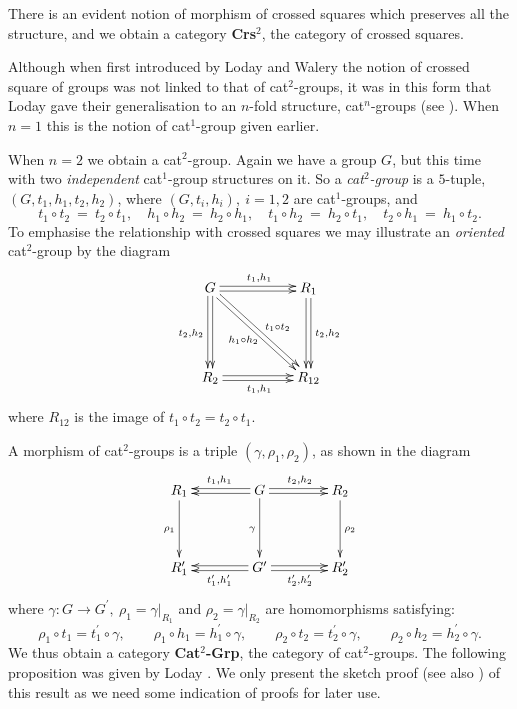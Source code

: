 \documentclass[a4paper,11pt]{article}
\theoremstyle{plain}
\theoremstyle{definition}
\begin{document}
There is an evident notion of morphism of crossed squares  
which preserves all the structure, 
and we obtain a category \textbf{Crs}$^{2}$, the category of crossed squares.

Although when first introduced by Loday and Walery \cite{walery-loday} 
the notion of crossed square of groups was not linked to that of cat$^{2}$-groups, 
it was in this form that Loday gave their generalisation 
to an $n$-fold structure, cat$^{n}$-groups (see \cite{Loday}). 
When $n=1$ this is the notion of cat$^1$-group given earlier.

When $n=2$ we obtain a cat$^{2}$-group. 
Again we have a group $G$, but this time with two \emph{independent} 
cat$^{1}$-group structures on it. 
So a \emph{cat$^{2}$-group} is a $5$-tuple, $(G,t_1,h_1,t_2,h_2)$, 
where $(G,t_{i},h_{i}),~ i=1,2$ are cat$^{1}$-groups, and
\[
t_{1} \circ t_{2} ~=~ t_{2} \circ t_{1}, \quad 
h_{1} \circ h_{2} ~=~ h_{2} \circ h_{1}, \quad 
t_{1} \circ h_{2} ~=~ h_{2} \circ t_{1}, \quad
t_{2} \circ h_{1} ~=~ h_{1} \circ t_{2}. 
\]
To emphasise the relationship with crossed squares 
we may illustrate an \emph{oriented} cat$^2$-group by the diagram 
\[
\xymatrix@R=50pt@C=50pt 
{ G \ar@<+0.4ex>[r]^{t_1,h_1} \ar@<-0.4ex>[r] 
    \ar@<-0.4ex>[d]_{t_2,h_2} \ar@<+0.4ex>[d] 
    \ar@<-0.4ex>[rd]^{\ t_1 \circ t_2} \ar@<+0.4ex>[rd]_{h_1 \circ h_2} 
	& R_1 \ar@<+0.4ex>[d]^{t_2,h_2} \ar@<-0.4ex>[d] \\
  R_2 \ar@<-0.4ex>[r]_{t_1,h_1} \ar@<+0.4ex>[r] 
	& R_{12} 
}
\]
where $R_{12}$ is the image of $t_1 \circ t_2 = t_2 \circ t_1$. 

\vspace{3mm}
A morphism of cat$^{2}$-groups is a triple $(\gamma ,\rho_1 ,\rho_2)$,
as shown in the diagram 
\[
\xymatrix@R=40pt@C=40pt 
{ R_1 \ar[d]_{\rho_1} 
	& G \ar[d]_{\gamma} \ar@<-0.4ex>[l]_{t_1,h_1} \ar@<+0.4ex>[l]  
	                    \ar@<+0.4ex>[r]^{t_2,h_2} \ar@<-0.4ex>[r] 
		& R_2 \ar[d]^{\rho_2} \\
  R'_1 
	& G' \ar@<+0.4ex>[l]^{t'_1,h'_1} \ar@<-0.4ex>[l] 
	     \ar@<-0.4ex>[r]_{t'_2,h'_2} \ar@<+0.4ex>[r] 
		& R'_2 
}
\]
\noindent where 
$\gamma : G \to G^{\prime},~ \rho_1 = \gamma|_{R_1}$ 
and $\rho_2 = \gamma|_{R_2}$ are homomorphisms satisfying: 
\[ 
\rho_1 \circ t_1 = t_1^{\prime} \circ \gamma, \qquad 
\rho_1 \circ h_1 = h_1^{\prime} \circ \gamma, \qquad 
\rho_2 \circ t_2 = t_2^{\prime} \circ \gamma, \qquad 
\rho_2 \circ h_2 = h_2^{\prime} \circ \gamma. 
\] 
We thus obtain a category \textbf{Cat}$^{2}$\textbf{-Grp}, 
the category of cat$^{2}$-groups. 
The following proposition was given by Loday \cite{Loday}. 
We only present the sketch proof (see also \cite{mutlu-porter-2003}) 
of this result as we need some indication of proofs for later use.
\end{document}
